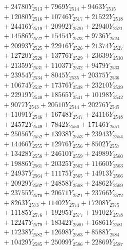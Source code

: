 \documentclass[a4paper,10pt]{article}
\begin{document}
{\begin{align}
&\;  + 24780 Y_{2513} + 7969 Y_{2514} + 9463 Y_{2515} \\[0.3ex]
&\;  + 12080 Y_{2516} + 10746 Y_{2517} + 21522 Y_{2518} \\[0.5ex]\allowbreak
&\;  + 24416 Y_{2519} + 20992 Y_{2520} + 22940 Y_{2521} \\[0.3ex]
&\;  + 14586 Y_{2522} + 15454 Y_{2523} + 9736 Y_{2524} \\[0.3ex]
&\;  + 20993 Y_{2525} + 22916 Y_{2526} + 21374 Y_{2527} \\[0.3ex]
&\;  + 12720 Y_{2528} + 13776 Y_{2529} + 23639 Y_{2530} \\[0.3ex]
&\;  + 21359 Y_{2531} + 11037 Y_{2532} + 9479 Y_{2533} \\[0.3ex]
&\;  + 23954 Y_{2534} + 8045 Y_{2535} + 20375 Y_{2536} \\[0.3ex]
&\;  + 10674 Y_{2537} + 17376 Y_{2538} + 23210 Y_{2539} \\[0.3ex]
&\;  + 22919 Y_{2540} + 18565 Y_{2541} + 10198 Y_{2542} \\[0.3ex]
&\;  + 9077 Y_{2543} + 20510 Y_{2544} + 20276 Y_{2545} \\[0.3ex]
&\;  + 11091 Y_{2546} + 16748 Y_{2547} + 24116 Y_{2548} \\[0.5ex]\allowbreak
&\;  + 24572 Y_{2549} + 7842 Y_{2550} + 17146 Y_{2551} \\[0.3ex]
&\;  + 25056 Y_{2552} + 13938 Y_{2553} + 23943 Y_{2554} \\[0.3ex]
&\;  + 14466 Y_{2555} + 12976 Y_{2556} + 8502 Y_{2557} \\[0.3ex]
&\;  + 13428 Y_{2558} + 24610 Y_{2559} + 24989 Y_{2560} \\[0.3ex]
&\;  + 19886 Y_{2561} + 20325 Y_{2562} + 11660 Y_{2563} \\[0.3ex]
&\;  + 24937 Y_{2564} + 11175 Y_{2565} + 14913 Y_{2566} \\[0.3ex]
&\;  + 20929 Y_{2567} + 24858 Y_{2568} + 24862 Y_{2569} \\[0.3ex]
&\;  + 23755 Y_{2570} + 20671 Y_{2571} + 23766 Y_{2572} \\[0.3ex]
&\;  + 8263 Y_{2573} + 11402 Y_{2574} + 17208 Y_{2575} \\[0.3ex]
&\;  + 11185 Y_{2576} + 19295 Y_{2577} + 19102 Y_{2578} \\[0.5ex]\allowbreak
&\;  + 12247 Y_{2579} + 18342 Y_{2580} + 16861 Y_{2581} \\[0.3ex]
&\;  + 17238 Y_{2582} + 12698 Y_{2583} + 8588 Y_{2584} \\[0.3ex]
&\;  + 10429 Y_{2585} + 25099 Y_{2586} + 22869 Y_{2587} \\[0.3ex]

\end{align}}
\end{document}
